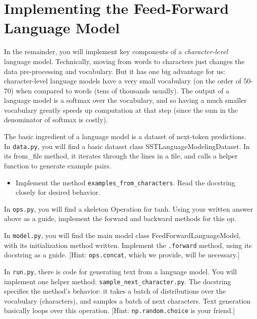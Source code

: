 \documentclass[11pt]{article}
\begin{document}
\section{Implementing the Feed-Forward Language Model}

In the remainder, you will implement key components of a \emph{character-level} language model.  Technically, moving from words to characters just changes the data pre-processing and vocabulary.  But it has one big advantage for us: character-level language models have a very small vocabulary (on the order of 50-70) when compared to words (tens of thousands usually).  The output of a language model is a softmax over the vocabulary, and so having a much smaller vocabulary greatly speeds up computation at that step (since the sum in the denominator of softmax is costly).

\vspace{2em}
 The basic ingredient of a language model is a dataset of next-token predictions. In \texttt{data.py}, you will find a basic dataset class SSTLanguageModelingDataset.  In its from\_file method, it iterates through the lines in a file, and calls a helper function to generate example pairs.
\begin{itemize}
  \item Implement the method \texttt{examples\_from\_characters}.  Read the docstring closely for desired behavior.
\end{itemize}

\vspace{2em}
  In \texttt{ops.py}, you will find a skeleton Operation for tanh.  Using your written answer above as a guide, implement the forward and backward methods for this op.

\vspace{2em}
 In \texttt{model.py}, you will find the main model class FeedForwardLanguageModel, with its initialization method written.  Implement the \texttt{.forward} method, using its docstring as a guide.  [Hint: \texttt{ops.concat}, which we provide, will be necessary.]

\vspace{2em}
  In \texttt{run.py}, there is code for generating text from a language model.  You will implement one helper method: \texttt{sample\_next\_character.py}.  The docstring specifies the method's behavior: it takes a batch of distributions over the vocabulary (characters), and samples a batch of next characters.  Text generation basically loops over this operation. [Hint: \texttt{np.random.choice} is your friend.]
\end{document}
